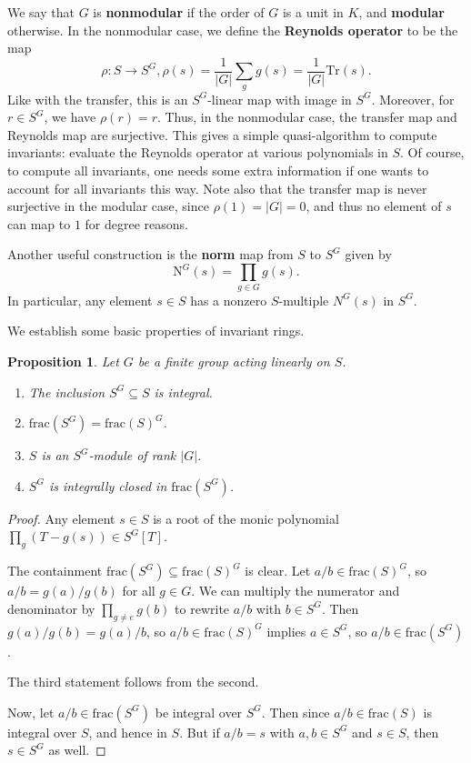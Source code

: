 \documentclass[12pt]{amsart}
\newtheorem{proposition}[theorem]{Proposition}
\theoremstyle{definition}
\numberwithin{equation}{theorem}
\def\to{\longrightarrow}
\begin{document}
We say that $G$ is \textbf{nonmodular} if the order of $G$ is a unit in $K$, and \textbf{modular} otherwise. In the nonmodular case, we define the \textbf{Reynolds operator} to be the map
\[\rho :S \to S^G, \rho(s) =\frac{1}{|G|} \sum_g g(s) = \frac{1}{|G|} \mathrm{Tr}(s).\]
Like with the transfer, this is an $S^G$-linear map with image in $S^G$. Moreover, for $r\in S^G$, we have $\rho(r) = r$. Thus, in the nonmodular case, the transfer map and Reynolds map are surjective. This gives a simple quasi-algorithm to compute invariants: evaluate the Reynolds operator at various polynomials in $S$. Of course, to compute all invariants, one needs some 
extra information if one wants to account for all invariants this way. Note also that the transfer map is never surjective in the modular case, since $\rho(1)=|G|=0$, and thus no element of $s$ can map to $1$ for degree reasons. 

Another useful construction is the \textbf{norm} map from $S$ to $S^G$ given by
\[ \mathrm{N}^G(s) = \prod_{g\in G} g(s).\]
In particular, any element $s\in S$ has a nonzero $S$-multiple $N^G(s)$ in $S^G$.



We establish some basic properties of invariant rings.

\begin{proposition}
Let $G$ be a finite group acting linearly on $S$. 
\begin{enumerate}
\item The inclusion $S^G \subseteq S$ is integral.
\item $\mathrm{frac}(S^G) = \mathrm{frac}(S)^G$.
\item $S$ is an $S^G$-module of rank $|G|$.
\item $S^G$ is integrally closed in $\mathrm{frac}(S^G)$.
\end{enumerate}
\end{proposition}
\begin{proof}
Any element $s\in S$ is a root of the monic polynomial $\prod_g (T - g(s)) \in S^G[T]$.

The containment $\mathrm{frac}(S^G) \subseteq \mathrm{frac}(S)^G$ is clear. Let $a/b\in \mathrm{frac}(S)^G$, so $a/b = g(a)/g(b)$ for all $g\in G$. We can multiply the numerator and denominator by $\prod_{g\neq e} g(b)$ to rewrite $a/b$ with $b\in S^G$. Then $g(a)/g(b)= g(a) / b$, so $a/b\in \mathrm{frac}(S)^G$ implies $a\in S^G$, so $a/b\in \mathrm{frac}(S^G)$.

The third statement follows from the second.

Now, let $a/b\in \mathrm{frac}(S^G)$ be integral over $S^G$. Then since $a/b\in \mathrm{frac}(S)$ is integral over $S$, and hence in $S$. But if $a/b =s$ with $a,b\in S^G$ and $s\in S$, then $s\in S^G$ as well.
\end{proof}
\end{document}
